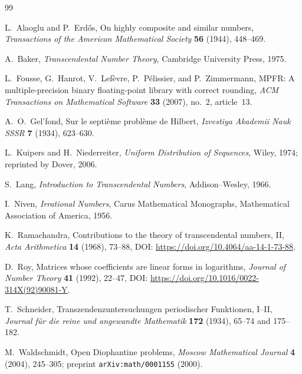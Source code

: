 \documentclass[11pt,oneside]{article}
\theoremstyle{definition}
\begin{document}
\begin{thebibliography}{99}

L.~Alaoglu and P.~Erd\H{o}s,
\newblock On highly composite and similar numbers,
\newblock \emph{Transactions of the American Mathematical Society} \textbf{56} (1944),
448--469.

A.~Baker,
\newblock \emph{Transcendental Number Theory},
\newblock Cambridge University Press, 1975.

L.~Fousse, G.~Hanrot, V.~Lef\`evre, P.~P\'elissier, and P.~Zimmermann,
\newblock MPFR: A multiple-precision binary floating-point library with correct rounding,
\newblock \emph{ACM Transactions on Mathematical Software} \textbf{33} (2007), no.~2,
article~13.

A.~O.~Gel'fond,
\newblock Sur le septi\`eme probl\`eme de Hilbert,
\newblock \emph{Izvestiya Akademii Nauk SSSR} \textbf{7} (1934), 623--630.

L.~Kuipers and H.~Niederreiter,
\newblock \emph{Uniform Distribution of Sequences},
\newblock Wiley, 1974; reprinted by Dover, 2006.

S.~Lang,
\newblock \emph{Introduction to Transcendental Numbers},
\newblock Addison--Wesley, 1966.

I.~Niven,
\newblock \emph{Irrational Numbers},
\newblock Carus Mathematical Monographs, Mathematical Association of America, 1956.

K.~Ramachandra,
\newblock Contributions to the theory of transcendental numbers, II,
\newblock \emph{Acta Arithmetica} \textbf{14} (1968), 73--88,
\newblock DOI: \url{https://doi.org/10.4064/aa-14-1-73-88}.

D.~Roy,
\newblock Matrices whose coefficients are linear forms in logarithms,
\newblock \emph{Journal of Number Theory} \textbf{41} (1992), 22--47,
\newblock DOI: \url{https://doi.org/10.1016/0022-314X(92)90081-Y}.

T.~Schneider,
\newblock Transzendenzuntersuchungen periodischer Funktionen, I--II,
\newblock \emph{Journal f\"ur die reine und angewandte Mathematik} \textbf{172}
(1934), 65--74 and 175--182.

M.~Waldschmidt,
\newblock Open Diophantine problems,
\newblock \emph{Moscow Mathematical Journal} \textbf{4} (2004), 245--305;
preprint \texttt{arXiv:math/0001155} (2000).


\end{thebibliography}
\end{document}
